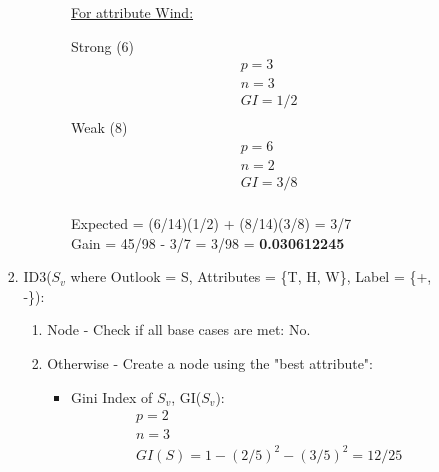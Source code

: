 \documentclass[8pt, fullpage,letterpaper]{article}
\begin{document}
\begin{enumerate}
\begin{enumerate}
\begin{enumerate}
\begin{enumerate}
\begin{itemize}
						\underline {For attribute Wind:} 
							\vspace{-5pt}
							\begin{multicols}{2}
								Strong (6)
			 						\begin{align*}
									    	& p = 3\\
										& n = 3 \\
									    	& GI = 1/2\\
								      \end{align*}
								Weak (8)
			 						\begin{align*}
									    	& p = 6\\
										& n = 2 \\
									    	& GI = 3/8\\
								      \end{align*}
							\end{multicols}
							\vspace{-20pt}
							Expected = (6/14)(1/2) + (8/14)(3/8) = 3/7\\
							Gain = 45/98 - 3/7 = 3/98 = {\bf 0.030612245}\\

					\centerline{}	
				\end{itemize}	
			\end{enumerate}


	 	\item ID3($S_v$ where Outlook = S, Attributes = \{T, H, W\}, Label = \{+, -\}): 
			\begin{enumerate}
			\item Node - Check if all base cases are met: {\color{red} No}.
			\item Otherwise - Create a node using the "best attribute":
				\begin{itemize}
					\item Gini Index of $S_v$, GI($S_v$):
						\begin{align*}
						    	& p = 2\\
							& n = 3 \\
						    	& GI(S) = 1 - (2/5)^2 - (3/5)^2 = 12/25
					      \end{align*}


\end{itemize}
\end{enumerate}
\end{enumerate}
\end{enumerate}
\end{enumerate}
\end{document}
